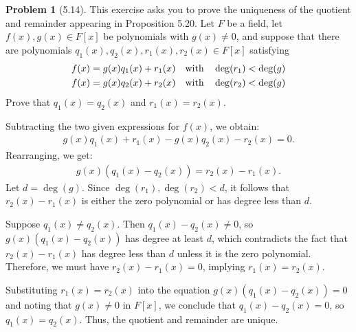 \documentclass[12pt]{article}
\theoremstyle{definition}
\newtheorem{problem}{Problem}
\begin{document}
\begin{problem}[5.14]
    This exercise asks you to prove the uniqueness of the quotient and remainder appearing in Proposition 5.20.
    Let $F$ be a field, let $f(x), g(x) \in F[x]$ be polynomials with $g(x) \neq 0$, and suppose that there are
    polynomials $q_1(x), q_2(x), r_1(x), r_2(x) \in F[x]$ satisfying
    \begin{align*}
        f(x) = g(x)q_1(x) + r_1(x) \hspace{10px} \text{with} \hspace{10px} \deg(r_1) < \deg(g)\\
        f(x) = g(x)q_2(x) + r_2(x) \hspace{10px} \text{with} \hspace{10px} \deg(r_2) < \deg(g)
    \end{align*}
    Prove that $q_1(x) = q_2(x)$ and $r_1(x) = r_2(x)$.

    \begin{solution}
        Subtracting the two given expressions for $f(x)$, we obtain:
        \begin{align*}
            g(x)q_1(x) + r_1(x) - g(x)q_2(x) - r_2(x) = 0.
        \end{align*}
        Rearranging, we get:
        \begin{align*}
            g(x)(q_1(x) - q_2(x)) = r_2(x) - r_1(x).
        \end{align*}
        Let $d = \deg(g)$. Since $\deg(r_1), \deg(r_2) < d$, it follows that $r_2(x) - r_1(x)$ is either the zero polynomial or has degree less than $d$.

        Suppose $q_1(x) \neq q_2(x)$. Then $q_1(x) - q_2(x) \neq 0$, so $g(x)(q_1(x) - q_2(x))$ has degree at least $d$, which contradicts the fact that $r_2(x) - r_1(x)$ has degree less than $d$ unless it is the zero polynomial. Therefore, we must have $r_2(x) - r_1(x) = 0$, implying $r_1(x) = r_2(x)$.

        Substituting $r_1(x) = r_2(x)$ into the equation $g(x)(q_1(x) - q_2(x)) = 0$ and noting that $g(x) \neq 0$ in $F[x]$, we conclude that $q_1(x) - q_2(x) = 0$, so $q_1(x) = q_2(x)$. Thus, the quotient and remainder are unique.
    
    \end{solution}
\end{problem}
\end{document}
